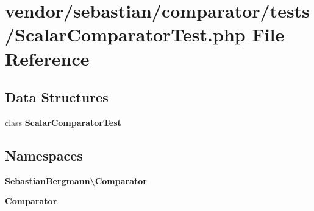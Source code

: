 \section{vendor/sebastian/comparator/tests/\+Scalar\+Comparator\+Test.php File Reference}
\label{_scalar_comparator_test_8php}
\subsection*{Data Structures}
\begin{DoxyCompactItemize}
\item 
class {\bf Scalar\+Comparator\+Test}
\end{DoxyCompactItemize}
\subsection*{Namespaces}
\begin{DoxyCompactItemize}
\item 
 {\bf Sebastian\+Bergmann\textbackslash{}\+Comparator}
\item 
 {\bf Comparator}
\end{DoxyCompactItemize}
